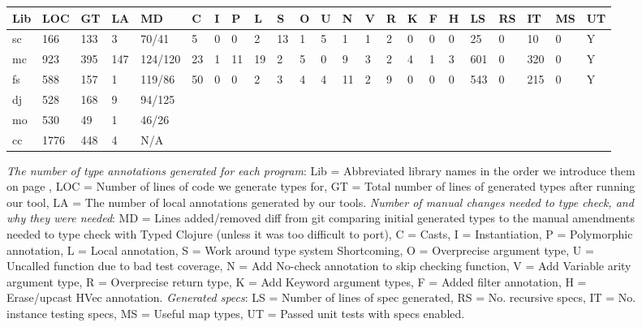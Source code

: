 \begin{figure*}
\begin{tabular}
{|         l   || l   | l  | l   || l  | l | l | l | l | l | l | l | l | l | l | l | l | l || l  | l  | l  | l | l |}
  Lib           & LOC  & GT  & LA & MD      & C  & I & P & L & S & O & U & N & V & R & K & F & H & LS & RS & IT & MS & UT\\ 
  \hline
  \hline
  sc            & 166  & 133 & 3  & 70/41   & 5  & 0 & 0 & 2 & 13& 1 & 5 & 1 & 1 & 2 & 0 & 0 & 0 & 25  & 0  & 10   & 0  & Y\\
  mc            & 923  & 395 & 147& 124/120 & 23 & 1 & 11& 19& 2 & 5 & 0 & 9 & 3 & 2 & 4 & 1 & 3 & 601 & 0  & 320  & 0  & Y\\
  fs            & 588  & 157 & 1  & 119/86  & 50 & 0 & 0 & 2 & 3 & 4 & 4 & 11& 2 & 9 & 0 & 0 & 0 & 543 & 0  & 215  & 0  & Y\\
  dj            & 528  & 168 & 9  & 94/125 \\
  mo            & 530  & 49  & 1  & 46/26\\
  cc            & 1776 & 448 & 4  & N/A 
  \\
\end{tabular}
  \caption{\emph{The number of type annotations generated for each program}:
  Lib = Abbreviated library names in the order we introduce them on page \pageref{infer:chap:evaluation},
  LOC = Number of lines of code we generate types for,
  GT = Total number of lines of generated types after running our tool,
  LA = The number of local annotations generated by our tools.
  \emph{Number of manual changes needed to type check, and why they were needed}:
  MD = Lines added/removed diff from git comparing initial generated types to
       the manual amendments needed to
       type check with Typed Clojure (unless it was too difficult to port),
  C = Casts,
  I = Instantiation,
  P = Polymorphic annotation,
  L = Local annotation,
  S = Work around type system Shortcoming,
  O = Overprecise argument type,
  U = Uncalled function due to bad test coverage,
  N = Add No-check annotation to skip checking function,
  V = Add Variable arity argument type,
  R = Overprecise return type,
  K = Add Keyword argument types,
  F = Added filter annotation,
  H = Erase/upcast HVec annotation.
  \emph{Generated specs}:
  LS = Number of lines of spec generated,
  RS = No. recursive specs,
  IT = No. instance testing specs,
  MS = Useful map types,
  UT = Passed unit tests with specs enabled.
  }
  \label{infer:fig:gentype}
\end{figure*}



